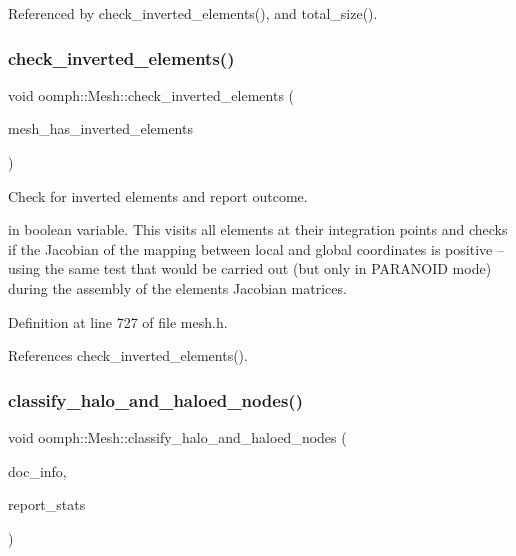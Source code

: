 Referenced by check\+\_\+inverted\+\_\+elements(), and total\+\_\+size().

\mbox{\label{classoomph_1_1Mesh_a5c95ee63b466247e6c57c38fb59c577c}} 
\subsubsection{\texorpdfstring{check\+\_\+inverted\+\_\+elements()}{check\_inverted\_elements()}\hspace{0.1cm}{\footnotesize\ttfamily [2/2]}}
{\footnotesize\ttfamily void oomph\+::\+Mesh\+::check\+\_\+inverted\+\_\+elements (\begin{DoxyParamCaption}\item[{bool \&}]{mesh\+\_\+has\+\_\+inverted\+\_\+elements }\end{DoxyParamCaption})\hspace{0.3cm}{\ttfamily [inline]}}



Check for inverted elements and report outcome. 

in boolean variable. This visits all elements at their integration points and checks if the Jacobian of the mapping between local and global coordinates is positive -- using the same test that would be carried out (but only in P\+A\+R\+A\+N\+O\+ID mode) during the assembly of the elements\textquotesingle{} Jacobian matrices. 

Definition at line 727 of file mesh.\+h.



References check\+\_\+inverted\+\_\+elements().

\mbox{\label{classoomph_1_1Mesh_a595cfa652d75d9fbfc72a8252fe6782e}} 
\subsubsection{\texorpdfstring{classify\+\_\+halo\+\_\+and\+\_\+haloed\+\_\+nodes()}{classify\_halo\_and\_haloed\_nodes()}\hspace{0.1cm}{\footnotesize\ttfamily [1/2]}}
{\footnotesize\ttfamily void oomph\+::\+Mesh\+::classify\+\_\+halo\+\_\+and\+\_\+haloed\+\_\+nodes (\begin{DoxyParamCaption}\item[{\hyperlink{classoomph_1_1DocInfo}{Doc\+Info} \&}]{doc\+\_\+info,  }\item[{const bool \&}]{report\+\_\+stats }\end{DoxyParamCaption})\hspace{0.3cm}{\ttfamily [virtual]}}



